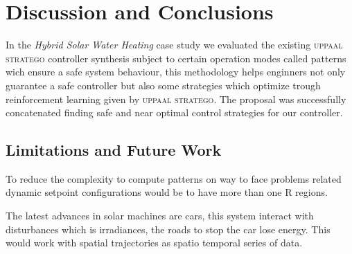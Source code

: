 \chapter{Discussion and Conclusions}
\label{ch:conclusions}
In the \emph{Hybrid Solar Water Heating} case study we evaluated the 
existing \textsc{uppaal stratego} controller synthesis subject to certain
operation modes called patterns wich ensure a safe system behaviour, this
methodology helps enginners not only guarantee a safe controller 
but also some strategies which optimize trough reinforcement learning
given by \textsc{uppaal stratego}. The proposal was successfully 
concatenated finding safe and near optimal control strategies for our 
controller.

\section{Limitations and Future Work}

\label{sec:limitations}

To reduce the complexity to compute patterns on way to face problems
related dynamic setpoint configurations would be to have more than 
one R regions.

The latest advances in solar machines are cars, this system interact with
disturbances which is irradiances, the roads to stop the car lose energy.
This would work with spatial trajectories as spatio temporal series of data.